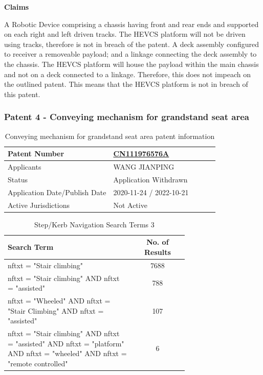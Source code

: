 \documentclass [12pt]{article}
\begin{document}
\textbf{Claims}

A Robotic Device comprising a chassis having front and rear ends and supported on each right and left driven tracks.
The HEVCS platform will not be driven using tracks, therefore is not in breach of the patent.
A deck assembly configured to receiver a removeable payload; and a linkage connecting the deck assembly to the chassis.
The HEVCS platform will house the payload within the main chassis and not on a deck connected to a linkage. Therefore, this does not impeach on the outlined patent.
This means that the HEVCS platform is not in breach of this patent.

\subsubsection{Patent 4 - Conveying mechanism for grandstand seat area}

\begin{table}[H]
    \centering
    \setlength{\arrayrulewidth}{1.5pt}
    \begin{tabular}{|p{0.5\linewidth}|p{0.5\linewidth}|}
    \hline
    Patent Number & \href{https://worldwide.espacenet.com/patent/search/family/044675803/publication/WO2011152890A2?q=WO2011152890A2}{CN111976576A}\\
    \hline
    Applicants & WANG JIANPING\\
    \hline
    Status & Application Withdrawn\\
    \hline
    Application Date/Publish Date & 2020-11-24 / 2022-10-21\\
    \hline
    Active Jurisdictions & Not Active\\
    \hline
    \end{tabular}
    \caption{Conveying mechanism for grandstand seat area patent information}
    \label{table:conveying_mechanism_for_grandstand_seat_area}
\end{table}

\begin{table}[H]
    \centering
    \setlength{\arrayrulewidth}{1.5pt}
    \begin{tabular}{|p{0.7\linewidth}|c|}
    \hline
    \cellcolor{gray!40}Search Term & \cellcolor{gray!40}No. of Results \\
    \hline
    nftxt = "Stair climbing" & 7688 \\
    \hline
    nftxt = "Stair climbing" AND nftxt = "assisted" & 788 \\
    \hline
    nftxt = "Wheeled" AND nftxt = "Stair Climbing" AND nftxt = "assisted" & 107 \\
    \hline
    nftxt = "Stair climbing" AND nftxt = "assisted" AND nftxt = "platform" AND nftxt = "wheeled" AND nftxt = "remote controlled"& 6 \\
    \hline
    \end{tabular}
    \caption{Step/Kerb Navigation Search Terms 3}
    \label{table:step_Kerb_nav_st_4}
\end{table}
\end{document}
